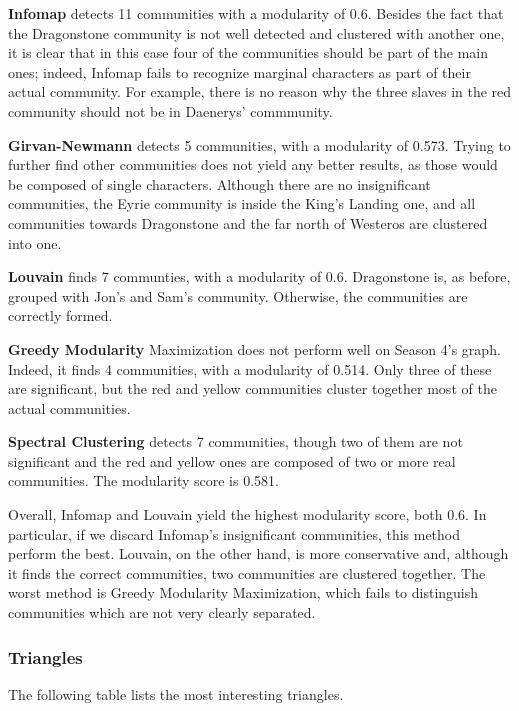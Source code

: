 \documentclass[10pt,twocolumn,letterpaper]{article}
\begin{document}
\textbf{Infomap} detects 11 communities with a modularity of 0.6. Besides the fact that the Dragonstone community is not well detected and clustered with another one, it is clear that in this case four of the communities should be part of the main ones; indeed, Infomap fails to recognize marginal characters as part of their actual community. For example, there is no reason why the three slaves in the red community should not be in Daenerys' commmunity. 

\textbf{Girvan-Newmann} detects 5 communities, with a modularity of 0.573. Trying to further find other communities does not yield any better results, as those would be composed of single characters. Although there are no insignificant communities, the Eyrie community is inside the King's Landing one, and all communities towards Dragonstone and the far north of Westeros are clustered into one.

\textbf{Louvain} finds 7 communties, with a modularity of 0.6. Dragonstone is, as before, grouped with Jon's and Sam's community. Otherwise, the communities are correctly formed. 

\textbf{Greedy Modularity} Maximization does not perform well on Season 4's graph. Indeed, it finds 4 communities, with a modularity of 0.514. Only three of these are significant, but the red and yellow communities cluster together most of the actual communities.

\textbf{Spectral Clustering} detects 7 communities, though two of them are not significant and the red and yellow ones are composed of two or more real communities. The modularity score is 0.581.

Overall, Infomap and Louvain yield the highest modularity score, both 0.6. In particular, if we discard Infomap's insignificant communities, this method perform the best. Louvain, on the other hand, is more conservative and, although it finds the correct communities, two communities are clustered together. The worst method is Greedy Modularity Maximization, which fails to distinguish communities which are not very clearly separated.

\subsubsection{Triangles}

The following table lists the most interesting triangles.
\end{document}
